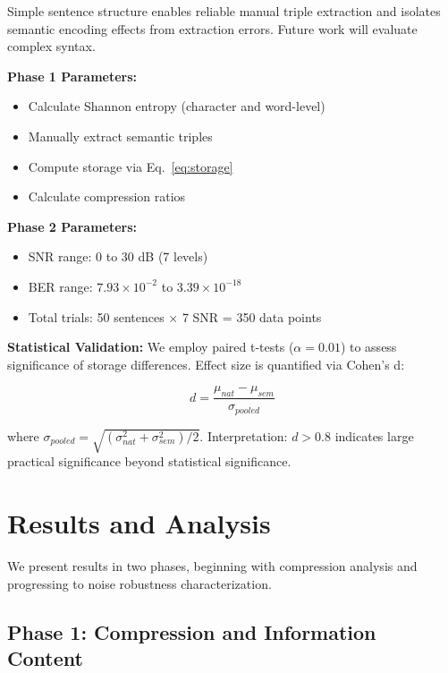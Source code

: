 \documentclass[conference]{IEEEtran}
\begin{document}
Simple sentence structure enables reliable manual triple extraction and 
isolates semantic encoding effects from extraction errors. Future work 
will evaluate complex syntax.

\textbf{Phase 1 Parameters:}
\begin{itemize}
\item Calculate Shannon entropy (character and word-level)
\item Manually extract semantic triples
\item Compute storage via Eq.~\eqref{eq:storage}
\item Calculate compression ratios
\end{itemize}

\textbf{Phase 2 Parameters:}
\begin{itemize}
\item SNR range: 0 to 30 dB (7 levels)
\item BER range: $7.93 \times 10^{-2}$ to $3.39 \times 10^{-18}$
\item Total trials: 50 sentences × 7 SNR = 350 data points
\end{itemize}

\textbf{Statistical Validation:} We employ paired t-tests ($\alpha = 0.01$) 
to assess significance of storage differences. Effect size is quantified 
via Cohen's d:

\begin{equation}
d = \frac{\mu_{nat} - \mu_{sem}}{\sigma_{pooled}}
\label{eq:cohens_d}
\end{equation}

where $\sigma_{pooled} = \sqrt{(\sigma^2_{nat} + \sigma^2_{sem})/2}$. 
Interpretation: $d > 0.8$ indicates large practical significance beyond 
statistical significance.

\section{Results and Analysis}

We present results in two phases, beginning with compression analysis 
and progressing to noise robustness characterization.

\subsection{Phase 1: Compression and Information Content}
\end{document}
